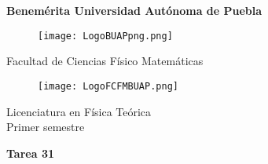 \documentclass[12pt]{article}
\begin{document}
\begingroup
\begin{titlepage}
	\noindent
	\vspace{1mm}
\end{titlepage}
\endgroup

\pagestyle{empty} 
\setlength{\parindent}{0pt}
\sffamily


\begin{center} 

    \LARGE{\bf{\textsf{Benemérita Universidad Autónoma de Puebla}}} \\[0.5cm]
    
\begin{figure}[htb] \centering

    \texttt{[image: LogoBUAPpng.png]} 

\end{figure}


    \LARGE{Facultad de Ciencias Físico Matemáticas}\\[0.5cm]

\begin{figure}[htb] \centering

    \texttt{[image: LogoFCFMBUAP.png]} 
    
\end{figure} 


    \Large{Licenciatura en Física Teórica}\\[0.5cm]
    \Large{Primer semestre} 

\end{center} \vspace{0.3cm}

\begin{center}

    {\Large{\bfseries{{\textcolor{carrotorange}{Tarea 31}}}}} \\ 
    
\end{center}
\end{document}
